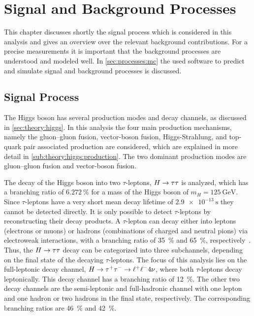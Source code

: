 \chapter{Signal and Background Processes}\label{cha:processes}

This chapter discusses shortly the signal process which is considered in this analysis and gives an overview
over the relevant background contributions.
For a precise measurements it is important that the background processes are understood and modeled well.
In \cref{sec:processes:mc} the used software to predict and simulate signal and background processes is discussed.

\section{Signal Process}\label{sec:processes:signal}

The Higgs boson has several production modes and decay channels, as discussed in \cref{sec:theory:higgs}.
In this analysis the four main production mechanisms, namely the gluon--gluon fusion, vector-boson fusion, Higgs-Strahlung, and
top-quark pair associated production are considered, which are explained in more detail in \cref{sub:theory:higgs:production}.
The two dominant production modes are gluon--gluon fusion and vector-boson fusion.

The decay of the Higgs boson into two $\tau$-leptons, $H \to \tau \tau$ is analyzed, which has a branching ratio of
$\SI{6.272}{\percent}$ for a mass of the Higgs boson of $m_H = \SI{125}{\GeV}$.
Since $\tau$-leptons have a very short mean decay lifetime of $\SI{2.9e-13}{\s}$ they cannot be detected
directly.
It is only possible to detect $\tau$-leptons by reconstructing their decay products.
A $\tau$-lepton can decay either into leptons (electrons or muons) or hadrons (combinations of charged and neutral pions)
via electroweak interactions, with a branching ratio of \SI{35}{\percent} and \SI{65}{\percent}, respectively~\cite{PDG}.
Thus, the $H \to \tau \tau$ decay can be categorized into three subchannels, depending on the final state of the decaying $\tau$-leptons.
The focus of this analysis lies on the full-leptonic decay channel, $H \to \tau^+\tau^- \to \ell^+\ell^- 4\nu$, where both $\tau$-leptons decay leptonically.
This decay channel has a branching ratio of \SI{12}{\percent}.
The other two decay channels are the semi-leptonic and full-hadronic channel with one lepton and one hadron or two hadrons
in the final state, respectively.
The corresponding branching ratios are \SI{46}{\percent} and \SI{42}{\percent}.

